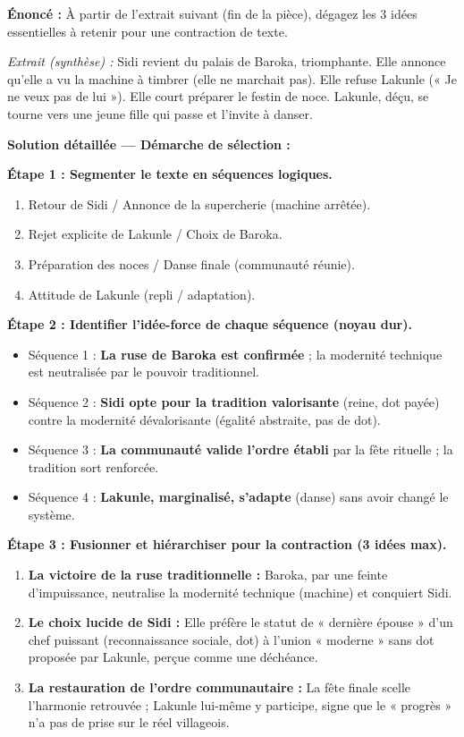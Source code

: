 \documentclass[11pt]{article}
\begin{document}
\begin{exoresolu}
\textbf{Énoncé :} À partir de l'extrait suivant (fin de la pièce), dégagez les 3 idées essentielles à retenir pour une contraction de texte.

\emph{Extrait (synthèse) :} Sidi revient du palais de Baroka, triomphante. Elle annonce qu'elle a vu la machine à timbrer (elle ne marchait pas). Elle refuse Lakunle (« Je ne veux pas de lui »). Elle court préparer le festin de noce. Lakunle, déçu, se tourne vers une jeune fille qui passe et l'invite à danser.

\tcblower
\textbf{Solution détaillée — Démarche de sélection :}

\textbf{Étape 1 : Segmenter le texte en séquences logiques.}
\begin{enumerate}
    \item Retour de Sidi / Annonce de la supercherie (machine arrêtée).
    \item Rejet explicite de Lakunle / Choix de Baroka.
    \item Préparation des noces / Danse finale (communauté réunie).
    \item Attitude de Lakunle (repli / adaptation).
\end{enumerate}

\textbf{Étape 2 : Identifier l'idée-force de chaque séquence (noyau dur).}
\begin{itemize}
    \item Séquence 1 : \textbf{La ruse de Baroka est confirmée} ; la modernité technique est neutralisée par le pouvoir traditionnel.
    \item Séquence 2 : \textbf{Sidi opte pour la tradition valorisante} (reine, dot payée) contre la modernité dévalorisante (égalité abstraite, pas de dot).
    \item Séquence 3 : \textbf{La communauté valide l'ordre établi} par la fête rituelle ; la tradition sort renforcée.
    \item Séquence 4 : \textbf{Lakunle, marginalisé, s'adapte} (danse) sans avoir changé le système.
\end{itemize}

\textbf{Étape 3 : Fusionner et hiérarchiser pour la contraction (3 idées max).}
\begin{enumerate}
    \item \textbf{La victoire de la ruse traditionnelle :} Baroka, par une feinte d'impuissance, neutralise la modernité technique (machine) et conquiert Sidi.
    \item \textbf{Le choix lucide de Sidi :} Elle préfère le statut de « dernière épouse » d'un chef puissant (reconnaissance sociale, dot) à l'union « moderne » sans dot proposée par Lakunle, perçue comme une déchéance.
    \item \textbf{La restauration de l'ordre communautaire :} La fête finale scelle l'harmonie retrouvée ; Lakunle lui-même y participe, signe que le « progrès » n'a pas de prise sur le réel villageois.
\end{enumerate}


\end{exoresolu}
\end{document}
